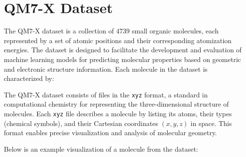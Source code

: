 \documentclass{article}
\begin{document}
\section{QM7-X Dataset}

The QM7-X dataset is a collection of 4739 small organic molecules, each represented by a set of atomic positions and their corresponding atomization energies. The dataset is designed to facilitate the development and evaluation of machine learning models for predicting molecular properties based on geometric and electronic structure information. Each molecule in the dataset is characterized by:  \newline

The QM7-X dataset consists of files in the \texttt{xyz} format, a standard in computational chemistry for representing the three-dimensional structure of molecules. Each \texttt{xyz} file describes a molecule by listing its atoms, their types (chemical symbols), and their Cartesian coordinates $(x, y, z)$ in space. This format enables precise visualization and analysis of molecular geometry. \newline

Below is an example visualization of a molecule from the dataset:
\begin{center}
    \begin{minipage}{0.95\linewidth}
      \centering
      \setlength{\fboxsep}{0pt} %
      \label{fig:xyz_molecule_example}
    \end{minipage}
\end{center}
\end{document}
